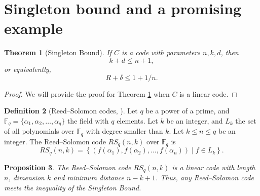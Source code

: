 \documentclass[11pt, oneside]{amsart}
\newtheorem{thm}{Theorem}[section]
\newtheorem{prop}[thm]{Proposition}
\theoremstyle{definition}
\newtheorem{defn}[thm]{Definition}
\theoremstyle{remark}
\numberwithin{equation}{section}
\begin{document}
\section{Singleton bound and a promising example} \label{s:singleton}
\begin{thm}[Singleton Bound]\label{thm:singleton_bound}
If $C$ is a code with parameters $n, k, d$, then 
	\begin{equation}
		k + d \le n + 1,
	\end{equation} 
	or equivalently, 
	\begin{equation}
		R + \delta \le 1 + 1/n.
	\end{equation}
\end{thm}

\begin{proof}
	We will provide the proof for Theorem \ref{thm:singleton_bound} when $C$ is a linear code.
\end{proof}

\begin{defn}[Reed--Solomon codes, \cite{LS87}]\label{defn:rs_codes}
	Let $q$ be a power of a prime, and $\mathbb{F}_q = \{\alpha_1, \alpha_2, \dots, \alpha_q\}$ the field with $q$ elements.
	Let $k$ be an integer, and ${L}_k$ the set of all polynomials over $\mathbb{F}_q$ with degree smaller than $k$.
	Let $k \le n \le q$ be an integer. The Reed--Solomon code $RS_q(n, k)$ over $\mathbb{F}_q$ is 
	\begin{equation}
		RS_q(n, k) = \left\{\left(f(\alpha_1), f(\alpha_2), \dots, f(\alpha_n)\right) \mid f \in {L}_k\right\}.
	\end{equation}
\end{defn}

\begin{prop}
	The Reed--Solomon code $RS_q(n, k)$ is a linear code with length $n$, dimension $k$ and minimum distance $n - k + 1$.
	Thus, any Reed--Solomon code meets the inequality of the Singleton Bound.
\end{prop}
\end{document}
